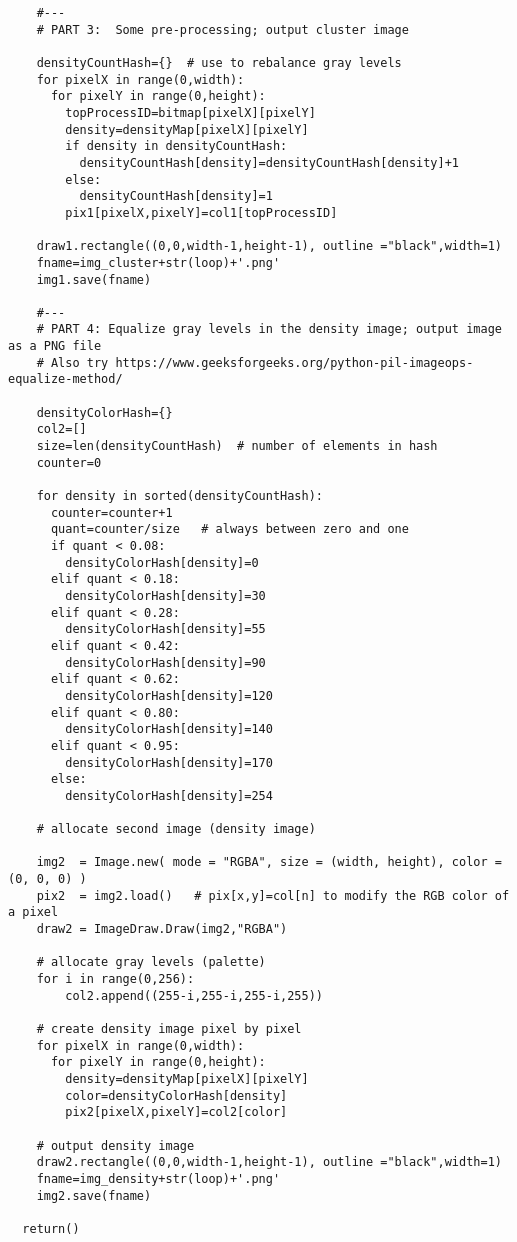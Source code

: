 \documentclass[oneside,10pt]{book}
\begin{document}
\begin{lstlisting}
    #---
    # PART 3:  Some pre-processing; output cluster image

    densityCountHash={}  # use to rebalance gray levels
    for pixelX in range(0,width):
      for pixelY in range(0,height):
        topProcessID=bitmap[pixelX][pixelY]
        density=densityMap[pixelX][pixelY]
        if density in densityCountHash:
          densityCountHash[density]=densityCountHash[density]+1
        else:
          densityCountHash[density]=1
        pix1[pixelX,pixelY]=col1[topProcessID]

    draw1.rectangle((0,0,width-1,height-1), outline ="black",width=1)
    fname=img_cluster+str(loop)+'.png'
    img1.save(fname)

    #---
    # PART 4: Equalize gray levels in the density image; output image as a PNG file
    # Also try https://www.geeksforgeeks.org/python-pil-imageops-equalize-method/

    densityColorHash={}
    col2=[]
    size=len(densityCountHash)  # number of elements in hash
    counter=0

    for density in sorted(densityCountHash):
      counter=counter+1
      quant=counter/size   # always between zero and one
      if quant < 0.08:
        densityColorHash[density]=0
      elif quant < 0.18:
        densityColorHash[density]=30
      elif quant < 0.28:
        densityColorHash[density]=55
      elif quant < 0.42:
        densityColorHash[density]=90
      elif quant < 0.62:
        densityColorHash[density]=120
      elif quant < 0.80:
        densityColorHash[density]=140
      elif quant < 0.95:
        densityColorHash[density]=170
      else:
        densityColorHash[density]=254

    # allocate second image (density image)

    img2  = Image.new( mode = "RGBA", size = (width, height), color = (0, 0, 0) )
    pix2  = img2.load()   # pix[x,y]=col[n] to modify the RGB color of a pixel
    draw2 = ImageDraw.Draw(img2,"RGBA")

    # allocate gray levels (palette)
    for i in range(0,256):
        col2.append((255-i,255-i,255-i,255))

    # create density image pixel by pixel
    for pixelX in range(0,width):
      for pixelY in range(0,height):
        density=densityMap[pixelX][pixelY]
        color=densityColorHash[density]
        pix2[pixelX,pixelY]=col2[color]

    # output density image
    draw2.rectangle((0,0,width-1,height-1), outline ="black",width=1)
    fname=img_density+str(loop)+'.png'
    img2.save(fname)

  return()
\end{lstlisting}
\end{document}
